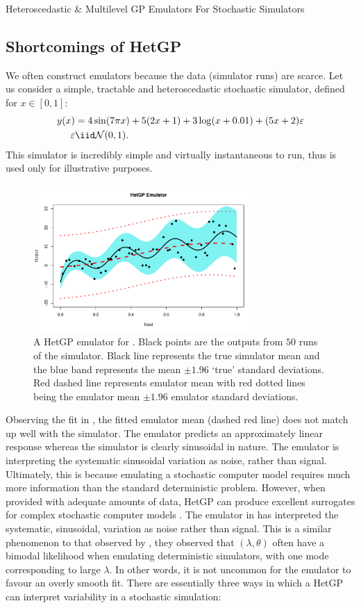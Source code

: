 \begin{chapter}{Heteroscedastic \& Multilevel GP Emulators For Stochastic Simulators\label{Ch:Hetsml}}
\subsection{Shortcomings of HetGP \label{hetgp-shortcomings}}

We often construct emulators because the data (simulator runs) are scarce. Let us consider a simple, tractable and heteroscedastic stochastic simulator, defined for $x \in [0,1]$:
\begin{align}
	y(x) &= 4\sin(7 \pi x) + 5(2x + 1) + 3 \log (x + 0.01) + (5x + 2)\varepsilon\label{Eq:toy-stoch}\\
	\varepsilon &\iid \mathcal{N}(0,1).
\end{align}
This simulator is incredibly simple and virtually instantaneous to run, thus is used only for illustrative purposes.
\begin{figure}[ht]
	\centering
	\includegraphics[width=0.75\textwidth]{sml-het-fig2/toy-hgp.pdf}
	\caption{A HetGP emulator for . Black points are the outputs from $50$ runs of the simulator. Black line represents the true simulator mean and the blue band represents the mean $\pm 1.96$ `true' standard deviations. Red dashed line represents emulator mean with red dotted lines being the emulator mean $\pm 1.96$ emulator standard deviations.}
	\label{Fig:toy-HetGP}
\end{figure}
Observing the fit in , the fitted emulator mean (dashed red line) does not match up well with the simulator. The emulator predicts an approximately linear response whereas the simulator is clearly sinusoidal in nature. The emulator is interpreting the systematic sinusoidal variation as noise, rather than signal. Ultimately, this is because emulating a stochastic computer model requires much more information than the standard deterministic problem. However, when provided with adequate amounts of data, HetGP can produce excellent surrogates for complex stochastic computer models \citep{Binois2018}. The emulator in \label{Fig:toy-HetGP} has interpreted the systematic, sinusoidal, variation as noise rather than signal. This is a similar phenomenon to that observed by \citet{Andrianakis2012}, they observed that $(\lambda, \theta)$ often have a bimodal likelihood when emulating deterministic simulators, with one mode corresponding to large $\lambda$. In other words, it is not uncommon for the emulator to favour an overly smooth fit. There are essentially three ways in which a HetGP can interpret variability in a stochastic simulation:

\end{chapter}
